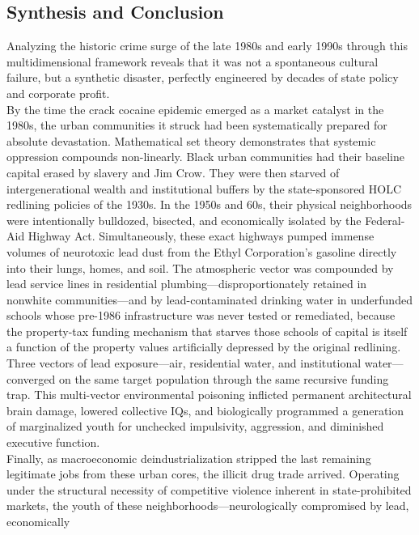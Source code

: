 \documentclass[
]{article}
\begin{document}
\subsection{\texorpdfstring{\textbf{Synthesis and
Conclusion}}{Synthesis and Conclusion}}\label{synthesis-and-conclusion}

Analyzing the historic crime surge of the late 1980s and early 1990s
through this multidimensional framework reveals that it was not a
spontaneous cultural failure, but a synthetic disaster, perfectly
engineered by decades of state policy and corporate profit.\\
By the time the crack cocaine epidemic emerged as a market catalyst in
the 1980s, the urban communities it struck had been systematically
prepared for absolute devastation. Mathematical set theory demonstrates
that systemic oppression compounds non-linearly. Black urban communities
had their baseline capital erased by slavery and Jim Crow. They were
then starved of intergenerational wealth and institutional buffers by
the state-sponsored HOLC redlining policies of the 1930s. In the 1950s
and 60s, their physical neighborhoods were intentionally bulldozed,
bisected, and economically isolated by the Federal-Aid Highway Act.
Simultaneously, these exact highways pumped immense volumes of
neurotoxic lead dust from the Ethyl Corporation's gasoline directly into
their lungs, homes, and soil. The atmospheric vector was compounded by
lead service lines in residential plumbing---disproportionately retained
in nonwhite communities---and by lead-contaminated drinking water in
underfunded schools whose pre-1986 infrastructure was never tested or
remediated, because the property-tax funding mechanism that starves
those schools of capital is itself a function of the property values
artificially depressed by the original redlining. Three vectors of lead
exposure---air, residential water, and institutional water---converged
on the same target population through the same recursive funding trap.
This multi-vector environmental poisoning inflicted permanent
architectural brain damage, lowered collective IQs, and biologically
programmed a generation of marginalized youth for unchecked impulsivity,
aggression, and diminished executive function.\\
Finally, as macroeconomic deindustrialization stripped the last
remaining legitimate jobs from these urban cores, the illicit drug trade
arrived. Operating under the structural necessity of competitive
violence inherent in state-prohibited markets, the youth of these
neighborhoods---neurologically compromised by lead, economically
\end{document}
